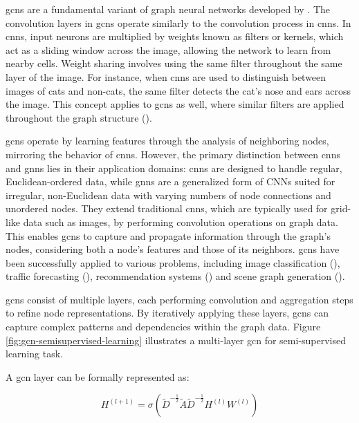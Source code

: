 \glspl{gcn} are a fundamental variant of graph neural networks developed by \cite{Kipf2017}.
The convolution layers in \glspl{gcn} operate similarly to the convolution process in \glspl{cnn}.
In \glspl{cnn}, input neurons are multiplied by weights known as filters or kernels, which act as a sliding window across the image, allowing the network to learn from nearby cells.
Weight sharing involves using the same filter throughout the same layer of the image.
For instance, when \glspl{cnn} are used to distinguish between images of cats and non-cats, the same filter detects the cat's nose and ears across the image.
This concept applies to \glspl{gcn} as well, where similar filters are applied throughout the graph structure (\cite{Kipf2017}).

\glspl{gcn} operate by learning features through the analysis of neighboring nodes, mirroring the behavior of \glspl{cnn}.
However, the primary distinction between \glspl{cnn} and \glspl{gnn} lies in their application domains: \glspl{cnn} are designed to handle regular, Euclidean-ordered data, while \glspl{gnn} are a generalized form of CNNs suited for irregular, non-Euclidean data with varying numbers of node connections and unordered nodes.
They extend traditional \glspl{cnn}, which are typically used for grid-like data such as images, by performing convolution operations on graph data.
This enables \glspl{gcn} to capture and propagate information through the graph's nodes, considering both a node's features and those of its neighbors.
\glspl{gcn} have been successfully applied to various problems, including image classification (\cite{Monti2016}), traffic forecasting (\cite{Cui2020}), recommendation systems (\cite{Fan2019}) and scene graph generation (\cite{Yang_2018_ECCV}).

\glspl{gcn} consist of multiple layers, each performing convolution and aggregation steps to refine node representations.
By iteratively applying these layers, \glspl{gcn} can capture complex patterns and dependencies within the graph data.
Figure \ref{fig:gcn-semisupervised-learning} illustrates a multi-layer \gls{gcn} for semi-supervised learning task.

A \gls{gcn} layer can be formally represented as:

\[ H^{(l+1)} = \sigma\left(\tilde{D}^{-\frac{1}{2}}\tilde{A}\tilde{D}^{-\frac{1}{2}} H^{(l)} W^{(l)}\right) \]

